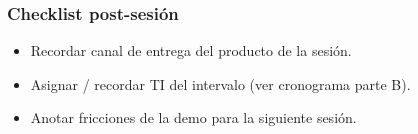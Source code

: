 \subsubsection*{Checklist post-sesión}
\begin{itemize}
\item[$\square$] Recordar canal de entrega del producto de la sesión.
\item[$\square$] Asignar / recordar TI del intervalo (ver cronograma parte B).
\item[$\square$] Anotar fricciones de la demo para la siguiente sesión.
\end{itemize}
